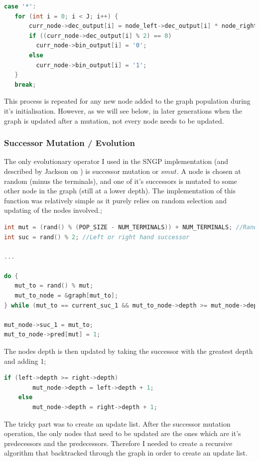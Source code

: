 \documentclass[a4paper,10.5pt]{article}
\begin{document}
\begin{lstlisting}[language=C]
case '*': 
   for (int i = 0; i < J; i++) {
       curr_node->dec_output[i] = node_left->dec_output[i] * node_right->dec_output[i];
       if ((curr_node->dec_output[i] % 2) == 0) 
         curr_node->bin_output[i] = '0';
       else
         curr_node->bin_output[i] = '1';        
   }
   break;
\end{lstlisting}

This process is repeated for any new node added to the graph population during it's initialisation. However, as we will see below, in later generations when the graph is updated after a mutation, not every node needs to be updated.

\subsubsection{Successor Mutation /  Evolution}
The only evolutionary operator I used in the SNGP implementation (and described by Jackson on \cite{jacksonsngp}) is successor mutation or $smut$. A node is chosen at random (minus the terminals), and one of it's successors is mutated to some other node in the graph (still at a lower depth). The implementation of this function was relatively simple as it purely relies on random selection and updating of the nodes involved.;


\begin{lstlisting}[language=C]
int mut = (rand() % (POP_SIZE - NUM_TERMINALS)) + NUM_TERMINALS; //Randomly pick node in graph (excluding terminals)
int suc = rand() % 2; //Left or right hand successor

...

do {
   mut_to = rand() % mut;
   mut_to_node = &graph[mut_to];
} while (mut_to == current_suc_1 && mut_to_node->depth >= mut_node->depth);

mut_node->suc_1 = mut_to;
mut_to_node->pred[mut] = 1;
\end{lstlisting}

The nodes depth is then updated by taking the successor with the greatest depth and adding 1;

\begin{lstlisting}[language=C]
if (left->depth >= right->depth)
		mut_node->depth = left->depth + 1;
	else
		mut_node->depth = right->depth + 1;
\end{lstlisting}

The tricky part was to create an update list. After the successor mutation operation, the only nodes that need to be updated are the ones which are it's predecessors and the predecessors. Therefore I needed to create a recursive algorithm that backtracked through the graph in order to create an update list.
\end{document}
